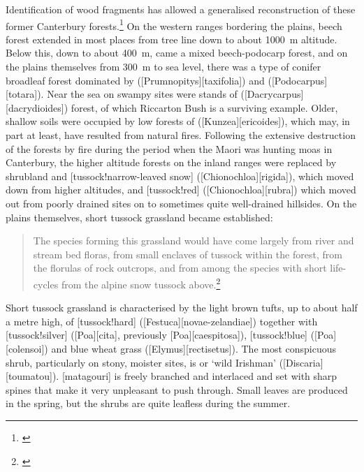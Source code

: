 Identification of wood fragments has allowed a generalised reconstruction of these former Canterbury forests.\footnote{\cite{molloy1969recent}}
On the western ranges bordering the plains, beech forest extended in most places from tree line down to about \SI{1000}{\metre} altitude.
Below this, down to about \SI{400}{\metre}, came a mixed beech-podocarp forest, and on the plains themselves from \SI{300}{\metre} to sea level, there was a type of conifer broadleaf forest dominated by  ([Prumnopitys][taxifolia]) and  ([Podocarpus][totara]).
Near the sea on swampy sites were stands of  ([Dacrycarpus][dacrydioides]) forest, of which Riccarton Bush is a surviving example.
Older, shallow soils were occupied by low forests of  ([Kunzea][ericoides]), which may, in part at least, have resulted from natural fires.
Following the extensive destruction of the forests by fire during the period when the Maori was hunting moas in Canterbury, the higher altitude forests on the inland ranges were replaced by shrubland and [tussock!narrow-leaved snow] ([Chionochloa][rigida]), which moved down from higher altitudes, and [tussock!red] ([Chionochloa][rubra]) which moved out from poorly drained sites on to sometimes quite well-drained hillsides.
On the plains themselves, short tussock grassland became established:

\begin{quote}
	The species forming this grassland would have come largely from river and stream bed floras, from small enclaves of tussock within the forest, from the florulas of rock outcrops, and from among the species with short life-cycles from the alpine snow tussock above.\footnote{\cite{connor1969montane}}
\end{quote}

Short tussock grassland is characterised by the light brown tufts, up to about half a metre high, of [tussock!hard] ([Festuca][novae-zelandiae]) together with [tussock!silver] ([Poa][cita], previously [Poa][caespitosa]), [tussock!blue] ([Poa][colensoi]) and blue wheat grass ([Elymus][rectisetus]).
The most conspicuous shrub, particularly on stony, moister sites, is  or `wild Irishman' ([Discaria][toumatou]).
[matagouri] is freely branched and interlaced and set with sharp spines that make it very unpleasant to push through.
Small leaves are produced in the spring, but the shrubs are quite leafless during the summer.

